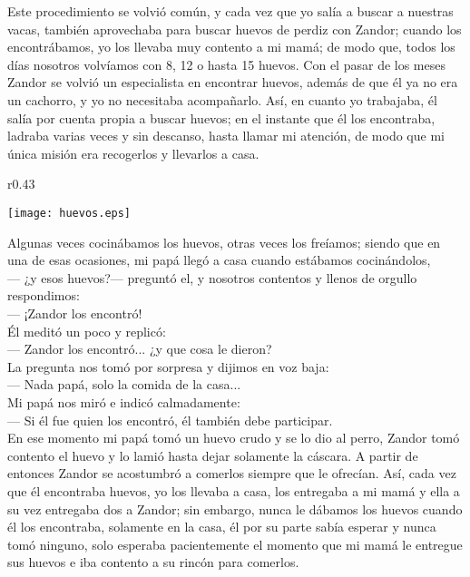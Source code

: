 Este procedimiento se volvió común, y cada vez que yo salía a buscar a nuestras vacas, también aprovechaba para buscar huevos de perdiz con Zandor; cuando los encontrábamos, yo los llevaba muy contento a mi mamá; de modo que, todos los días nosotros volvíamos con 8, 12 o hasta 15 huevos.
Con el pasar de los meses Zandor se volvió un especialista en encontrar huevos, además de que él ya no era un cachorro, y yo no necesitaba acompañarlo. Así, en cuanto yo trabajaba, él salía por cuenta propia a buscar huevos; en el instante que él los encontraba, ladraba varias veces y sin descanso, hasta llamar mi atención, de modo que mi única misión era recogerlos y llevarlos a casa.
\ifdefined\EnableIncludeImages
\begin{wrapfigure}{r}{0.43\textwidth}
  \begin{center}
  \vspace{-20pt}
    \texttt{[image: huevos.eps]}
  \end{center}
  \vspace{-20pt}
\end{wrapfigure}
\fi
Algunas veces cocinábamos los huevos, otras veces los freíamos; siendo que en una de esas ocasiones, mi papá llegó a casa cuando estábamos cocinándolos,\\\indent
--- ¿y esos huevos?--- preguntó el, 
y nosotros contentos y llenos de orgullo respondimos:\\\indent
--- ¡Zandor los encontró!\\\indent
Él meditó un poco y replicó:\\\indent 
--- Zandor los encontró... ¿y que cosa le dieron?\\\indent 
La pregunta nos tomó por sorpresa y dijimos en voz baja:\\\indent 
--- Nada papá, solo la comida de la casa...\\\indent
Mi papá nos miró e indicó calmadamente:\\\indent 
--- Si él fue quien los encontró, él también debe participar.\\\indent
En ese momento mi papá tomó un huevo crudo y se lo dio al perro, Zandor tomó contento el huevo y lo lamió hasta dejar solamente la cáscara. A partir de entonces Zandor se acostumbró a comerlos siempre que le ofrecían. Así, cada vez que él encontraba huevos, yo los llevaba a casa, los entregaba a mi mamá y ella a su vez entregaba dos a Zandor; sin embargo, nunca le dábamos los huevos cuando él los encontraba, solamente en la casa, él por su parte sabía esperar y nunca tomó ninguno, solo esperaba pacientemente el momento que mi mamá le entregue sus huevos e iba contento a su rincón para comerlos.


